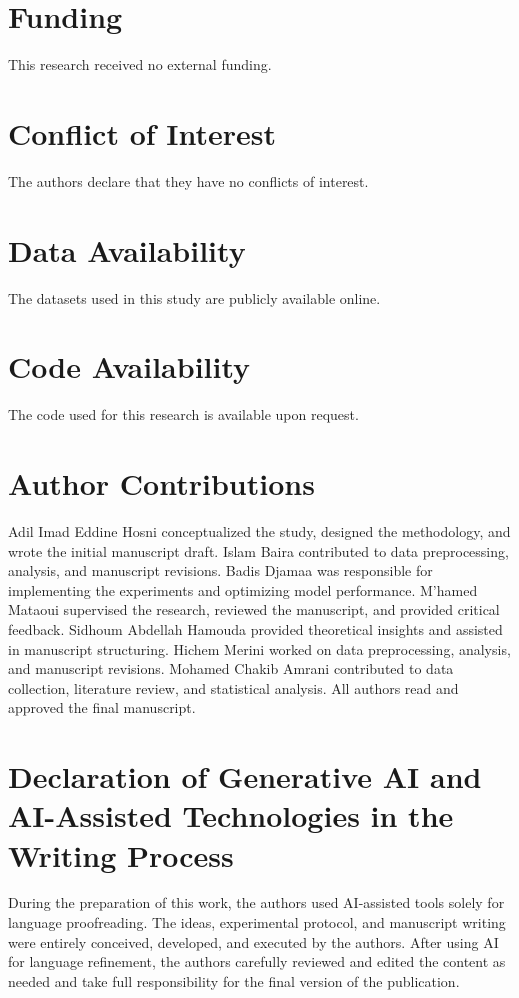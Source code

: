 \documentclass[pdflatex,sn-mathphys-num]{sn-jnl}%
\theoremstyle{thmstyleone}%
\theoremstyle{thmstyletwo}%
\theoremstyle{thmstylethree}%
\theoremstyle{plain} %
\theoremstyle{definition} %
\theoremstyle{remark} %
\theoremstyle{plain} %
\begin{document}
\section*{Funding}
This research received no external funding.

\section*{Conflict of Interest}
The authors declare that they have no conflicts of interest.

\section*{Data Availability}
The datasets used in this study are publicly available online.

\section*{Code Availability}
The code used for this research is available upon request.

\section*{Author Contributions}
Adil Imad Eddine Hosni conceptualized the study, designed the methodology, and wrote the initial manuscript draft.  
Islam Baira contributed to data preprocessing, analysis, and manuscript revisions.  
Badis Djamaa was responsible for implementing the experiments and optimizing model performance.  
M’hamed Mataoui supervised the research, reviewed the manuscript, and provided critical feedback.  
Sidhoum Abdellah Hamouda provided theoretical insights and assisted in manuscript structuring.  
Hichem Merini worked on data preprocessing, analysis, and manuscript revisions.  
Mohamed Chakib Amrani contributed to data collection, literature review, and statistical analysis.  
All authors read and approved the final manuscript.

\section*{Declaration of Generative AI and AI-Assisted Technologies in the Writing Process}

During the preparation of this work, the authors used AI-assisted tools solely for language proofreading. The ideas, experimental protocol, and manuscript writing were entirely conceived, developed, and executed by the authors. After using AI for language refinement, the authors carefully reviewed and edited the content as needed and take full responsibility for the final version of the publication.
\end{document}
